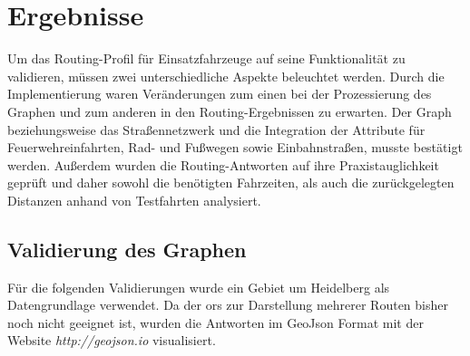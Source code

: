 \section{Ergebnisse}

Um das Routing-Profil für Einsatzfahrzeuge auf seine Funktionalität zu validieren, müssen zwei unterschiedliche Aspekte beleuchtet werden.
Durch die Implementierung waren Veränderungen zum einen bei der Prozessierung des Graphen und zum anderen in den Routing-Ergebnissen zu erwarten.
Der Graph beziehungsweise das Straßennetzwerk und die Integration der Attribute für Feuerwehreinfahrten, Rad- und Fußwegen sowie Einbahnstraßen, musste bestätigt werden.
Außerdem wurden die Routing-Antworten auf ihre Praxistauglichkeit geprüft und daher sowohl die benötigten Fahrzeiten, als auch die zurückgelegten Distanzen anhand von Testfahrten analysiert.


\subsection{Validierung des Graphen}

Für die folgenden Validierungen wurde ein Gebiet um Heidelberg als Datengrundlage verwendet.
Da der \gls{ors} zur Darstellung mehrerer Routen bisher noch nicht geeignet ist, wurden die Antworten im GeoJson Format mit der Website \textit{http://geojson.io} visualisiert.

